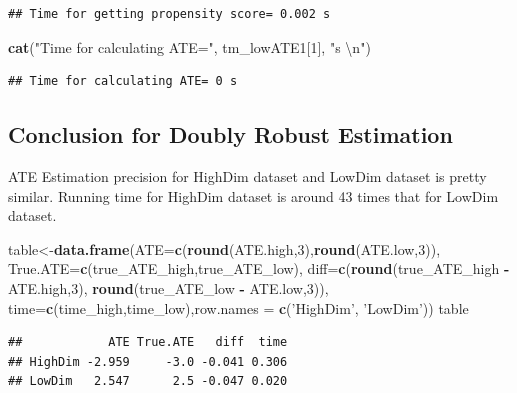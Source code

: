 \documentclass[]{article}
\newenvironment{Shaded}{\begin{snugshade}}{\end{snugshade}}
\newcommand{\CharTok}[1]{\textcolor[rgb]{0.31,0.60,0.02}{#1}}
\newcommand{\DataTypeTok}[1]{\textcolor[rgb]{0.13,0.29,0.53}{#1}}
\newcommand{\DecValTok}[1]{\textcolor[rgb]{0.00,0.00,0.81}{#1}}
\newcommand{\KeywordTok}[1]{\textcolor[rgb]{0.13,0.29,0.53}{\textbf{#1}}}
\newcommand{\NormalTok}[1]{#1}
\newcommand{\OperatorTok}[1]{\textcolor[rgb]{0.81,0.36,0.00}{\textbf{#1}}}
\newcommand{\StringTok}[1]{\textcolor[rgb]{0.31,0.60,0.02}{#1}}
\begin{document}
\begin{verbatim}
## Time for getting propensity score= 0.002 s
\end{verbatim}

\begin{Shaded}
\begin{Highlighting}[]
\KeywordTok{cat}\NormalTok{(}\StringTok{"Time for calculating ATE="}\NormalTok{, tm_lowATE1[}\DecValTok{1}\NormalTok{], }\StringTok{"s }\CharTok{\textbackslash{}n}\StringTok{"}\NormalTok{)}
\end{Highlighting}
\end{Shaded}

\begin{verbatim}
## Time for calculating ATE= 0 s
\end{verbatim}

\hypertarget{conclusion-for-doubly-robust-estimation}{%
\subsection{Conclusion for Doubly Robust
Estimation}\label{conclusion-for-doubly-robust-estimation}}

ATE Estimation precision for HighDim dataset and LowDim dataset is
pretty similar. Running time for HighDim dataset is around 43 times that
for LowDim dataset.

\begin{Shaded}
\begin{Highlighting}[]
\NormalTok{table<-}\KeywordTok{data.frame}\NormalTok{(}\DataTypeTok{ATE=}\KeywordTok{c}\NormalTok{(}\KeywordTok{round}\NormalTok{(ATE.high,}\DecValTok{3}\NormalTok{),}\KeywordTok{round}\NormalTok{(ATE.low,}\DecValTok{3}\NormalTok{)),}
                  \DataTypeTok{True.ATE=}\KeywordTok{c}\NormalTok{(true_ATE_high,true_ATE_low), }
                  \DataTypeTok{diff=}\KeywordTok{c}\NormalTok{(}\KeywordTok{round}\NormalTok{(true_ATE_high }\OperatorTok{-}\StringTok{ }\NormalTok{ATE.high,}\DecValTok{3}\NormalTok{),}
                         \KeywordTok{round}\NormalTok{(true_ATE_low }\OperatorTok{-}\StringTok{ }\NormalTok{ATE.low,}\DecValTok{3}\NormalTok{)),}
                  \DataTypeTok{time=}\KeywordTok{c}\NormalTok{(time_high,time_low),}\DataTypeTok{row.names =} \KeywordTok{c}\NormalTok{(}\StringTok{'HighDim'}\NormalTok{, }\StringTok{'LowDim'}\NormalTok{))}
\NormalTok{table}
\end{Highlighting}
\end{Shaded}

\begin{verbatim}
##            ATE True.ATE   diff  time
## HighDim -2.959     -3.0 -0.041 0.306
## LowDim   2.547      2.5 -0.047 0.020
\end{verbatim}
\end{document}
